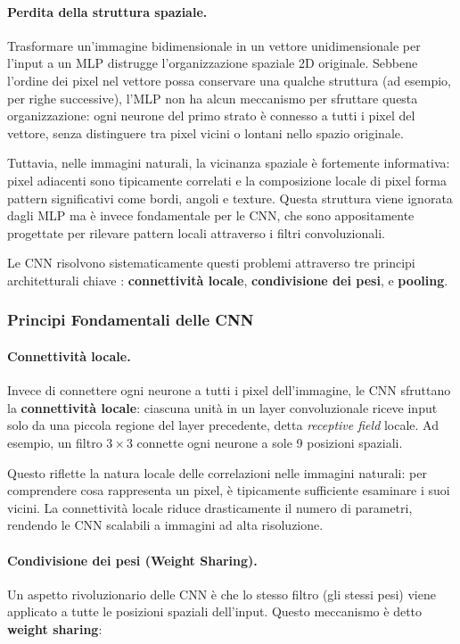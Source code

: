 \paragraph{Perdita della struttura spaziale.} Trasformare un'immagine bidimensionale in un vettore unidimensionale per l'input a un MLP distrugge l'organizzazione spaziale 2D originale. Sebbene l'ordine dei pixel nel vettore possa conservare una qualche struttura (ad esempio, per righe successive), l'MLP non ha alcun meccanismo per sfruttare questa organizzazione: ogni neurone del primo strato è connesso a tutti i pixel del vettore, senza distinguere tra pixel vicini o lontani nello spazio originale.

Tuttavia, nelle immagini naturali, la vicinanza spaziale è fortemente informativa: pixel adiacenti sono tipicamente correlati e la composizione locale di pixel forma pattern significativi come bordi, angoli e texture. Questa struttura viene ignorata dagli MLP ma è invece fondamentale per le CNN, che sono appositamente progettate per rilevare pattern locali attraverso i filtri convoluzionali.

Le CNN risolvono sistematicamente questi problemi attraverso tre principi architetturali chiave \cite{lecun2015deep}: \textbf{connettività locale}, \textbf{condivisione dei pesi}, e \textbf{pooling}.

\subsubsection{Principi Fondamentali delle CNN}
\paragraph{Connettività locale.} Invece di connettere ogni neurone a tutti i pixel dell'im\-ma\-gi\-ne, le CNN sfruttano la \textbf{connettività locale}: ciascuna unità in un layer convoluzionale riceve input solo da una piccola regione del layer precedente, detta \textit{receptive field} locale. Ad esempio, un filtro $3 \times 3$ connette ogni neurone a sole 9 posizioni spaziali. 

Questo riflette la natura locale delle correlazioni nelle immagini naturali: per comprendere cosa rappresenta un pixel, è tipicamente sufficiente esaminare i suoi vicini. La connettività locale riduce drasticamente il numero di parametri, rendendo le CNN scalabili a immagini ad alta risoluzione.

\paragraph{Condivisione dei pesi (Weight Sharing).} Un aspetto rivoluzionario delle CNN è che lo stesso filtro (gli stessi pesi) viene applicato a tutte le posizioni spaziali dell'input. Questo meccanismo è detto \textbf{weight sharing}:

